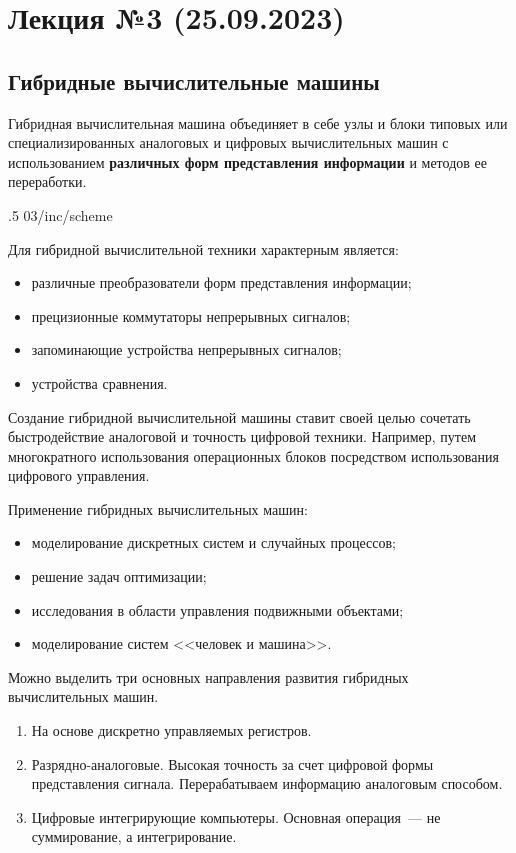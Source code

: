 \section{Лекция №3 (25.09.2023)}

\subsection{Гибридные вычислительные машины}

Гибридная вычислительная машина объединяет в себе узлы и блоки типовых или специализированных аналоговых и цифровых вычислительных машин с использованием \textbf{различных форм представления информации} и методов ее переработки.

\image
{.5\textwidth}
{03/inc/scheme}
{}

Для гибридной вычислительной техники характерным является:

\begin{itemize}
    \item различные преобразователи форм представления информации;
    \item прецизионные коммутаторы непрерывных сигналов;
    \item запоминающие устройства непрерывных сигналов;
    \item устройства сравнения.
\end{itemize}

Создание гибридной вычислительной машины ставит своей целью сочетать быстродействие аналоговой и точность цифровой техники. Например, путем многократного использования операционных блоков посредством использования цифрового управления.

Применение гибридных вычислительных машин:

\begin{itemize}
    \item моделирование дискретных систем и случайных процессов;
    \item решение задач оптимизации;
    \item исследования в области управления подвижными объектами;
    \item моделирование систем <<человек и машина>>.
\end{itemize}

Можно выделить три основных направления развития гибридных вычислительных машин.

\begin{enumerate}
    \item На основе дискретно управляемых регистров.
    \item Разрядно-аналоговые. Высокая точность за счет цифровой формы представления сигнала. Перерабатываем информацию аналоговым способом.
    \item Цифровые интегрирующие компьютеры. Основная операция~--- не суммирование, а интегрирование.
\end{enumerate}

